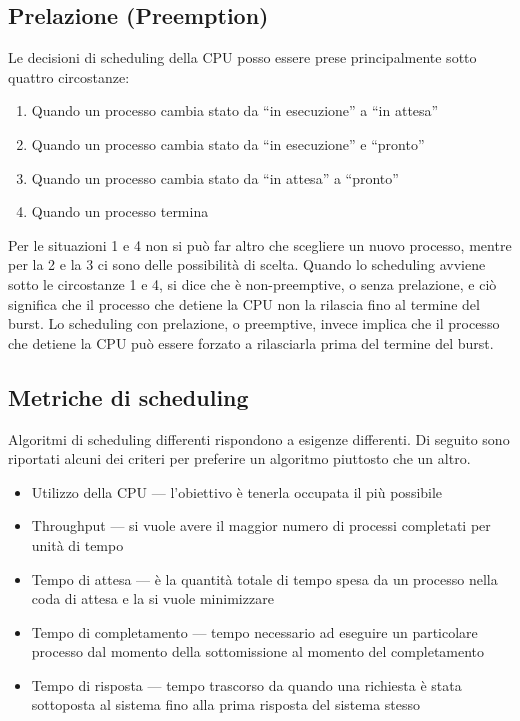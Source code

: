 \documentclass[a4paper]{article}
\begin{document}
\subsection{Prelazione (Preemption)}
Le decisioni di scheduling della CPU posso essere prese principalmente sotto quattro circostanze:
\begin{enumerate}
   \item Quando un processo cambia stato da ``in esecuzione'' a ``in attesa''
   \item Quando un processo cambia stato da ``in esecuzione'' e ``pronto''
   \item Quando un processo cambia stato da ``in attesa'' a ``pronto''
   \item Quando un processo termina
\end{enumerate}
Per le situazioni 1 e 4 non si può far altro che scegliere un nuovo processo, mentre per la 2 e la 3 ci sono delle possibilità di scelta.
Quando lo scheduling avviene sotto le circostanze 1 e 4, si dice che è non-preemptive, o senza prelazione, e ciò significa che il processo che detiene la CPU non la rilascia fino al termine del burst. \newline
Lo scheduling con prelazione, o preemptive, invece implica che il processo che detiene la CPU può essere forzato a rilasciarla prima del termine del burst.

\subsection{Metriche di scheduling}
Algoritmi di scheduling differenti rispondono a esigenze differenti. Di seguito sono riportati alcuni dei criteri per preferire un algoritmo piuttosto che un altro.
\begin{itemize}
   \item Utilizzo della CPU --- l'obiettivo è tenerla occupata il più possibile
   \item Throughput --- si vuole avere il maggior numero di processi completati per unità di tempo
   \item Tempo di attesa --- è la quantità totale di tempo spesa da un processo nella coda di attesa e la si vuole minimizzare
   \item Tempo di completamento --- tempo necessario ad eseguire un particolare processo dal momento della sottomissione al momento del completamento
   \item Tempo di risposta --- tempo trascorso da quando una richiesta è stata sottoposta al sistema fino alla prima risposta del sistema stesso
\end{itemize}
\end{document}
